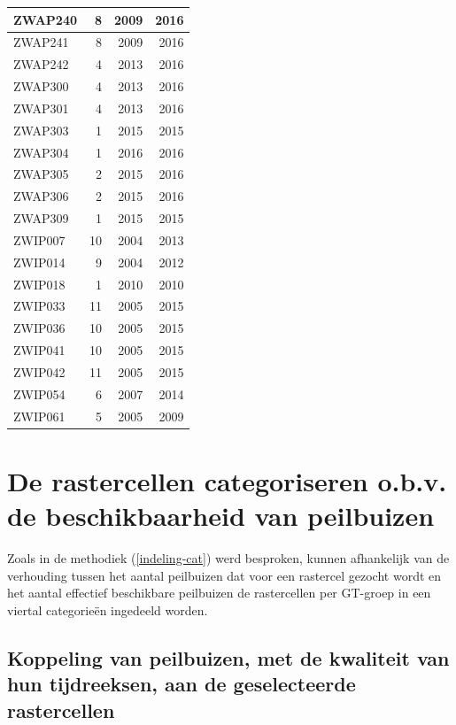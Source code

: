 \documentclass[11pt,]{book}
\begin{document}
\begin{table}
\begin{tabular}[t]{l|r|r|r}
\hline
ZWAP240 & 8 & 2009 & 2016\\
\hline
ZWAP241 & 8 & 2009 & 2016\\
\hline
ZWAP242 & 4 & 2013 & 2016\\
\hline
ZWAP300 & 4 & 2013 & 2016\\
\hline
ZWAP301 & 4 & 2013 & 2016\\
\hline
ZWAP303 & 1 & 2015 & 2015\\
\hline
ZWAP304 & 1 & 2016 & 2016\\
\hline
ZWAP305 & 2 & 2015 & 2016\\
\hline
ZWAP306 & 2 & 2015 & 2016\\
\hline
ZWAP309 & 1 & 2015 & 2015\\
\hline
ZWIP007 & 10 & 2004 & 2013\\
\hline
ZWIP014 & 9 & 2004 & 2012\\
\hline
ZWIP018 & 1 & 2010 & 2010\\
\hline
ZWIP033 & 11 & 2005 & 2015\\
\hline
ZWIP036 & 10 & 2005 & 2015\\
\hline
ZWIP041 & 10 & 2005 & 2015\\
\hline
ZWIP042 & 11 & 2005 & 2015\\
\hline
ZWIP054 & 6 & 2007 & 2014\\
\hline
ZWIP061 & 5 & 2005 & 2009\\
\hline
\end{tabular}
\end{table}

\section{De rastercellen categoriseren o.b.v. de beschikbaarheid van
peilbuizen}\label{de-rastercellen-categoriseren-o.b.v.-de-beschikbaarheid-van-peilbuizen}

Zoals in de methodiek (\ref{indeling-cat}) werd besproken, kunnen
afhankelijk van de verhouding tussen het aantal peilbuizen dat voor een
rastercel gezocht wordt en het aantal effectief beschikbare peilbuizen
de rastercellen per GT-groep in een viertal categorieën ingedeeld
worden.

\subsection{Koppeling van peilbuizen, met de kwaliteit van hun
tijdreeksen, aan de geselecteerde
rastercellen}\label{koppeling-van-peilbuizen-met-de-kwaliteit-van-hun-tijdreeksen-aan-de-geselecteerde-rastercellen}
\end{document}
